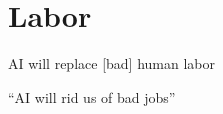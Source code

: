 \documentclass[aspectratio=43,17pt]{beamer} %
\begin{document}

\section{Labor}

\begin{frame}[standout]

AI will replace [bad] human labor

\end{frame}



\begin{frame}{``AI will rid us of bad jobs''}
    \begin{columns}
    \begin{column}{0.4\textwidth}
    
    

\end{column}
\end{columns}
\end{frame}
\end{document}
